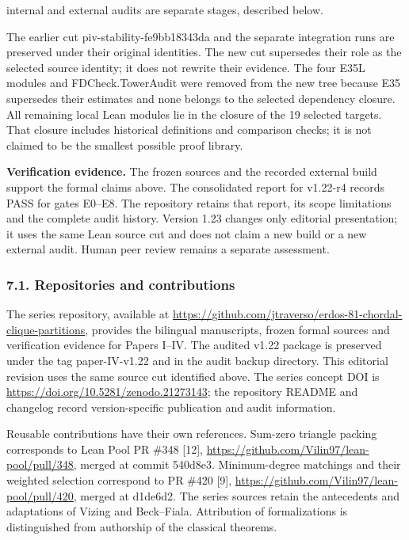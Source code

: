 \documentclass[english,11pt,a4paper]{article}
\newcounter{none}
\begin{document}
internal and external audits are separate stages, described below.

The earlier cut {\ttfamily\small piv-\discretionary{\hbox{\ensuremath{\hookrightarrow}}}{}{}stability-\discretionary{\hbox{\ensuremath{\hookrightarrow}}}{}{}fe9bb18343da} and the separate integration runs are preserved under their original identities. The new cut supersedes their role as the selected source identity; it does not rewrite their evidence. The four E35L modules and {\ttfamily\small FDCheck.\discretionary{\hbox{\ensuremath{\hookrightarrow}}}{}{}TowerAudit} were removed from the new tree because E35 supersedes their estimates and none belongs to the selected dependency closure. All remaining local Lean modules lie in the closure of the 19 selected targets. That closure includes historical definitions and comparison checks; it is not claimed to be the smallest possible proof library.

\textbf{Verification evidence.} The frozen sources and the recorded external build support the formal claims above. The consolidated report for v1.22-r4 records PASS for gates E0--E8. The repository retains that report, its scope limitations and the complete audit history. Version 1.23 changes only editorial presentation; it uses the same Lean source cut and does not claim a new build or a new external audit. Human peer review remains a separate assessment.

\subsubsection{7.1. Repositories and contributions}\label{repositories-and-contributions}

The series repository, available at \url{https://github.com/jtraverso/erdos-81-chordal-clique-partitions}, provides the bilingual manuscripts, frozen formal sources and verification evidence for Papers I--IV. The audited v1.22 package is preserved under the tag {\ttfamily\small paper-\discretionary{\hbox{\ensuremath{\hookrightarrow}}}{}{}IV-\discretionary{\hbox{\ensuremath{\hookrightarrow}}}{}{}v1.\discretionary{\hbox{\ensuremath{\hookrightarrow}}}{}{}22} and in the audit backup directory. This editorial revision uses the same source cut identified above. The series concept DOI is \url{https://doi.org/10.5281/zenodo.21273143}; the repository README and changelog record version-specific publication and audit information.

Reusable contributions have their own references. Sum-zero triangle packing corresponds to Lean Pool PR \#348 {[}12{]}, \url{https://github.com/Vilin97/lean-pool/pull/348}, merged at commit {\ttfamily\small 540d8e3}. Minimum-degree matchings and their weighted selection correspond to PR \#420 {[}9{]}, \url{https://github.com/Vilin97/lean-pool/pull/420}, merged at {\ttfamily\small d1de6d2}. The series sources retain the antecedents and adaptations of Vizing and Beck--Fiala. Attribution of formalizations is distinguished from authorship of the classical theorems.
\end{document}
